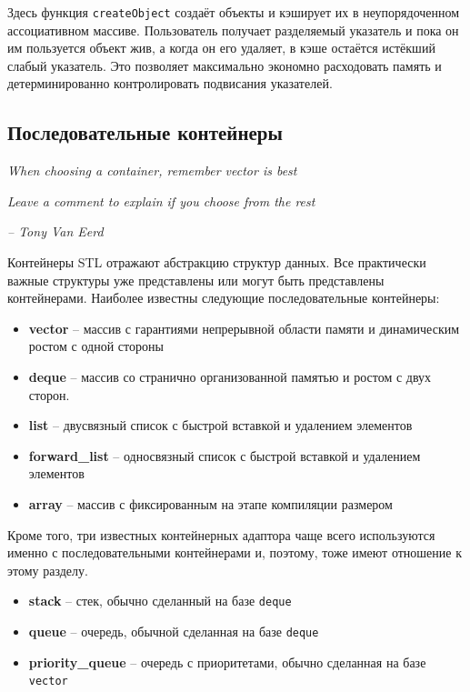 \documentclass[a4paper,12pt,oneside]{article}
\begin{document}
Здесь функция \lstinline!createObject! создаёт объекты и кэширует их в неупорядоченном ассоциативном массиве. Пользователь получает разделяемый указатель и пока он им пользуется объект жив, а когда он его удаляет, в кэше остаётся истёкший слабый указатель. Это позволяет максимально экономно расходовать память и детерминированно контролировать подвисания указателей.

\pagebreak
\subsection{Последовательные контейнеры}\label{SeqContainers}

\hfill\textit{When choosing a container, remember vector is best}

\hfill\textit{Leave a comment to explain if you choose from the rest}{\vspace{0.5em}}

\hfill\textit{-- Tony Van Eerd}

Контейнеры STL отражают абстракцию структур данных. Все практически важные структуры уже представлены или могут быть представлены контейнерами. Наиболее известны следующие последовательные контейнеры:

\begin{itemize}
\item \textbf{vector} -- массив с гарантиями непрерывной области памяти и динамическим ростом с одной стороны
\item \textbf{deque} -- массив со странично организованной памятью и ростом с двух сторон.
\item \textbf{list} -- двусвязный список с быстрой вставкой и удалением элементов
\item \textbf{forward\_list} -- односвязный список с быстрой вставкой и удалением элементов
\item \textbf{array} -- массив с фиксированным на этапе компиляции размером
\end{itemize}

Кроме того, три известных контейнерных адаптора чаще всего используются именно с последовательными контейнерами и, поэтому, тоже имеют отношение к этому разделу.

\begin{itemize}
\item \textbf{stack} -- стек, обычно сделанный на базе \lstinline!deque!
\item \textbf{queue} -- очередь, обычной сделанная на базе \lstinline!deque!
\item \textbf{priority\_queue} -- очередь с приоритетами, обычно сделанная на базе \lstinline!vector!
\end{itemize}
\end{document}
